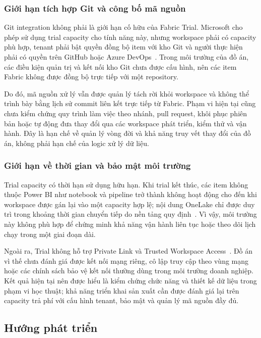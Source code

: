 \subsubsection{Giới hạn tích hợp Git và công bố mã nguồn}

Git integration không phải là giới hạn cố hữu của Fabric Trial. Microsoft cho phép sử dụng trial capacity cho tính năng này, nhưng workspace phải có capacity phù hợp, tenant phải bật quyền đồng bộ item với kho Git và người thực hiện phải có quyền trên GitHub hoặc Azure DevOps~\citep{microsoft-fabric-git}. Trong môi trường của đồ án, các điều kiện quản trị và kết nối kho Git chưa được cấu hình, nên các item Fabric không được đồng bộ trực tiếp với một repository.

Do đó, mã nguồn xử lý vẫn được quản lý tách rời khỏi workspace và không thể trình bày bằng lịch sử commit liên kết trực tiếp từ Fabric. Phạm vi hiện tại cũng chưa kiểm chứng quy trình làm việc theo nhánh, pull request, khôi phục phiên bản hoặc tự động đưa thay đổi qua các workspace phát triển, kiểm thử và vận hành. Đây là hạn chế về quản lý vòng đời và khả năng truy vết thay đổi của đồ án, không phải hạn chế của logic xử lý dữ liệu.

\subsubsection{Giới hạn về thời gian và bảo mật môi trường}

Trial capacity có thời hạn sử dụng hữu hạn. Khi trial kết thúc, các item không thuộc Power BI như notebook và pipeline trở thành không hoạt động cho đến khi workspace được gán lại vào một capacity hợp lệ; nội dung OneLake chỉ được duy trì trong khoảng thời gian chuyển tiếp do nền tảng quy định~\citep{microsoft-fabric-trial}. Vì vậy, môi trường này không phù hợp để chứng minh khả năng vận hành liên tục hoặc theo dõi lịch chạy trong một giai đoạn dài.

Ngoài ra, Trial không hỗ trợ Private Link và Trusted Workspace Access~\citep{microsoft-fabric-trial}. Đồ án vì thế chưa đánh giá được kết nối mạng riêng, cô lập truy cập theo vùng mạng hoặc các chính sách bảo vệ kết nối thường dùng trong môi trường doanh nghiệp. Kết quả hiện tại nên được hiểu là kiểm chứng chức năng và thiết kế dữ liệu trong phạm vi học thuật; khả năng triển khai sản xuất cần được đánh giá lại trên capacity trả phí với cấu hình tenant, bảo mật và quản lý mã nguồn đầy đủ.

\subsection{Hướng phát triển}

